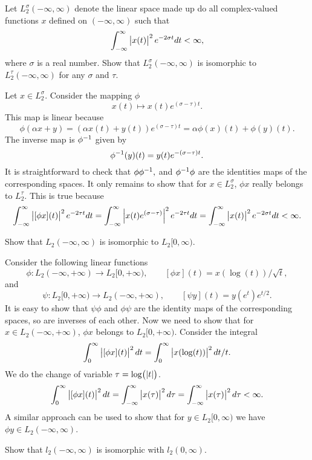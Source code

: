 \begin{problem}
	Let $ L_2^\sigma(-\infty,\infty) $ denote the linear space made up do all complex-valued functions $ x $ defined on $ (-\infty,\infty) $ such that
	\[ \int_{-\infty}^{\infty}\left|x(t)\right|^2e^{-2\sigma t} dt < \infty, \]
	where $ \sigma $ is a real number. Show that $ L_2^\sigma(-\infty,\infty) $ is isomorphic to $ L_2^\tau(-\infty,\infty) $ for any $ \sigma $ and $ \tau $.
\end{problem}


\begin{solution}
	Let $ x\in L_2^\sigma $. Consider the mapping $ \phi $
	\[ x(t) \mapsto x(t)e^{(\sigma-\tau)t}. \]
	This map is linear because
	\[ \phi(\alpha x + y) = (\alpha x(t)+y(t))e^{(\sigma-\tau)t} = \alpha\phi(x)(t) + \phi(y)(t). \]
	The inverse map is $ \phi^{-1} $ given by
	\[ \phi^{-1}(y)(t) = y(t)e^{-(\sigma-\tau)t}.  \]
	It is straightforward to check that $ \phi\phi^{-1},$ and $\phi^{-1}\phi $ are the identities maps of the corresponding spaces. It only remains to show that for $ x\in L_2^\sigma $, $ \phi x $ really belongs to $ L_2^\tau $. This is true because
	\[ \int_{-\infty}^{\infty}\left|[\phi x](t)\right|^2 e^{-2\tau t}dt =\int_{-\infty}^{\infty}\left|x(t)e^{(\sigma -\tau)}\right|^2 e^{-2\tau t}dt = \int_{-\infty}^{\infty}\left|x(t)\right|^2 e^{-2\sigma t}dt < \infty.  \] 
\end{solution}


\begin{problem}
	Show that $ L_2(-\infty,\infty) $ is isomorphic to $ L_2[0,\infty). $
\end{problem}
\begin{solution}
	Consider the following linear functions
	\[ \phi: L_2(-\infty,+\infty) \to L_2[0,+\infty),\qquad [\phi x](t) = x(\log(t))/\sqrt{t}, \]
	and 
	\[ \psi: L_2[0,+\infty) \to L_2(-\infty,+\infty),\qquad [\psi y](t) = y(e^{t})e^{t/2}. \]
	It is easy to show that $ \psi\phi $ and $ \phi\psi $ are the identity maps of the corresponding spaces, so are inverses of each other.
	Now we need to show that for $ x\in L_2(-\infty,+\infty) $, $ \phi x $ belongs to $ L_2[0,+\infty) $. Consider the integral
	\[ \int_{0}^{\infty}\left|[\phi x](t)\right|^2dt = \int_{0}^{\infty}\left|x(\log(t))\right|^2 dt/t. \]
	We do the change of variable $ \tau = \log(\left|t\right|) $.
	\[ \int_{0}^{\infty}\left|[\phi x](t)\right|^2dt = \int_{-\infty}^{\infty}\left|x(\tau)\right|^2 d\tau = \int_{-\infty}^{\infty} \left|x(\tau)\right|^2 d\tau < \infty. \]
	A similar approach can be used to show that for $ y\in L_2[0,\infty) $ we have $ \phi y \in L_2(-\infty,\infty) $.
\end{solution}


\begin{problem}
	Show that $ l_2(-\infty,\infty) $ is isomorphic with $ l_2(0,\infty) $.
\end{problem}